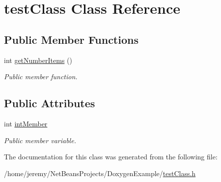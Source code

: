 \hypertarget{classtest_class}{
\section{testClass Class Reference}
\label{classtest_class}
}
\subsection*{Public Member Functions}
\begin{DoxyCompactItemize}
\item 
\hypertarget{classtest_class_a8da4832799e86dde0f0c258b6d7f78e2}{
int \hyperlink{classtest_class_a8da4832799e86dde0f0c258b6d7f78e2}{getNumberItems} ()}
\label{classtest_class_a8da4832799e86dde0f0c258b6d7f78e2}

\begin{DoxyCompactList}\small\item\em Public member function. \item\end{DoxyCompactList}\end{DoxyCompactItemize}
\subsection*{Public Attributes}
\begin{DoxyCompactItemize}
\item 
\hypertarget{classtest_class_a461dc2c6143e22d7b434fcd5a9cd65ff}{
int \hyperlink{classtest_class_a461dc2c6143e22d7b434fcd5a9cd65ff}{intMember}}
\label{classtest_class_a461dc2c6143e22d7b434fcd5a9cd65ff}

\begin{DoxyCompactList}\small\item\em Public member variable. \item\end{DoxyCompactList}\end{DoxyCompactItemize}


The documentation for this class was generated from the following file:\begin{DoxyCompactItemize}
\item 
/home/jeremy/NetBeansProjects/DoxygenExample/\hyperlink{test_class_8h}{testClass.h}\end{DoxyCompactItemize}
